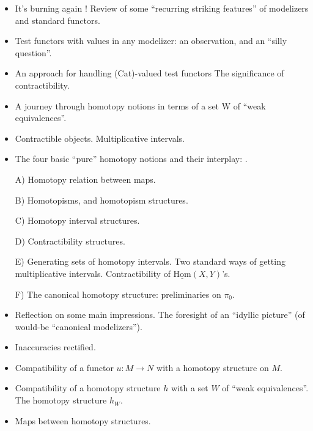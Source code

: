 \documentclass[11pt,a4paper]{article}
\begin{document}
\begin{itemize}
  \item[45.] It's burning again ! Review of some ``recurring striking features'' of modelizers\add{,} and  standard \struck{\ill{}}  functors.
  \item[(46.)] Test functors with values in any modelizer: an observation, and an  ``silly question''.
  \item[47.] An approach for handling (Cat)-valued test functors\add{,}  The significance of contractibility.
  \item[48.] A journey through  homotopy notions\add{,} in terms of a set W of ``weak equivalences''.
  \item[49.] Contractible objects. Multiplicative intervals.
  \item[(50.)] The four basic ``pure'' homotopy notions and their interplay:   .

  A) Homotopy relation between maps.

  B) Homotopisms, and homotopism structures.

  C) Homotopy interval structures.

  D) Contractibility structures.

  E) Generating sets of homotopy intervals. Two standard ways of getting multiplicative intervals. Contractibility of $\underline{\mathrm{Hom}}(X,Y)$'s.

  F) The canonical homotopy structure: preliminaries on $\pi_{0}$.
  \item[(51.)] Reflection on some main impressions. The foresight of an ``idyllic picture'' (of would-be ``canonical modelizers'').
  \item[52.] Inaccuracies rectified.
  \item[53.] Compatibility of a functor $u\colon M\to N$ with a homotopy structure on $M$.
  \item[54.] Compatibility of a homotopy structure $h$ with a set $W$ of ``weak equivalences''. The homotopy structure $h_{W}$.
  \item[55.] Maps between homotopy structures.
\end{itemize}
\end{document}
